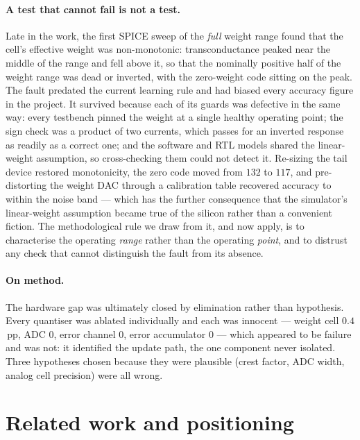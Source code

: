 \documentclass[11pt]{article}
\begin{document}
\paragraph{A test that cannot fail is not a test.} Late in the work, the first SPICE sweep of the
\emph{full} weight range found that the cell's effective weight was non-monotonic: transconductance
peaked near the middle of the range and fell above it, so that the nominally positive half of the
weight range was dead or inverted, with the zero-weight code sitting on the peak. The fault predated
the current learning rule and had biased every accuracy figure in the project. It survived because
each of its guards was defective in the same way: every testbench pinned the weight at a single
healthy operating point; the sign check was a product of two currents, which passes for an inverted
response as readily as a correct one; and the software and RTL models shared the linear-weight
assumption, so cross-checking them could not detect it. Re-sizing the tail device restored
monotonicity, the zero code moved from $132$ to $117$, and pre-distorting the weight DAC through a
calibration table recovered accuracy to within the noise band --- which has the further consequence
that the simulator's linear-weight assumption became true of the silicon rather than a convenient
fiction. The methodological rule we draw from it, and now apply, is to characterise
the operating \emph{range} rather than the operating \emph{point}, and to distrust any check that
cannot distinguish the fault from its absence.

\paragraph{On method.} The hardware gap was ultimately closed by elimination rather than hypothesis.
Every quantiser was ablated individually and each was innocent --- weight cell $0.4$\,pp, ADC $0$,
error channel $0$, error accumulator $0$ --- which appeared to be failure and was not: it identified
the update path, the one component never isolated. Three hypotheses chosen because they were
plausible (crest factor, ADC width, analog cell precision) were all wrong.

\section{Related work and positioning}\label{sec:related}
\end{document}

